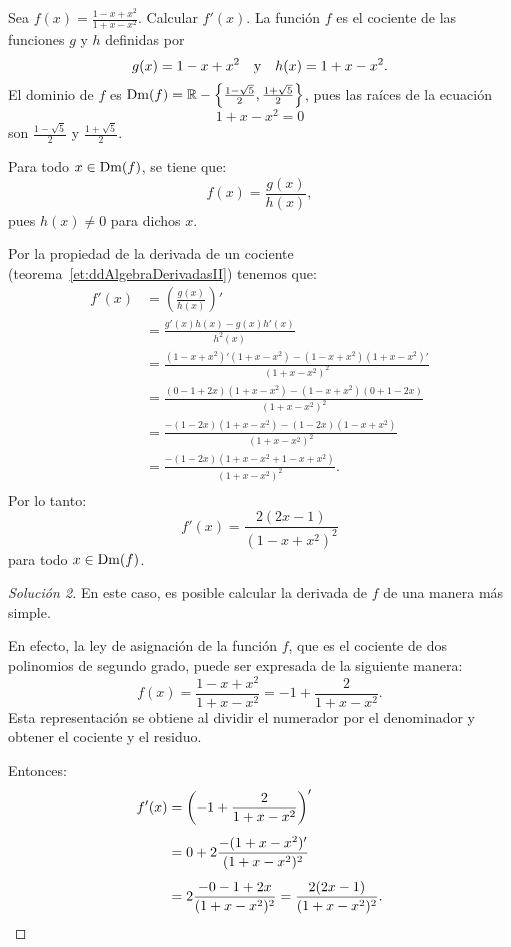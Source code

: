 \begin{exemplo}[Solución]{%
Sea $\displaystyle f(x) = \frac{1 - x + x^2}{1 + x - x^2}$. Calcular $f'(x)$.
}%
La función $f$ es el cociente de las funciones $g$ y $h$ definidas por
\[
g(x) = 1 - x + x^2 \quad\text{y}\quad h(x) = 1 + x - x^2.
\]
El dominio de $f$ es $\operatorname{Dm}(f) = \mathbb{R} - \left\{\frac{1-\sqrt{5}}{2},\frac{1 +
\sqrt{5}}{2}\right\}$, pues las raíces de la ecuación
\[
1 + x - x^2 = 0
\]
son $\frac{1-\sqrt{5}}{2}$ y $\frac{1 + \sqrt{5}}{2}$.

Para todo $x\in\operatorname{Dm}(f)$, se tiene que:
\[
f(x) = \frac{g(x)}{h(x)},
\]
pues $h(x) \neq 0$ para dichos $x$.

Por la propiedad de la derivada de un cociente (teorema~\ref{et:ddAlgebraDerivadasII}) tenemos que:
\begin{align*}
f'(x) &= \left(\frac{g(x)}{h(x)}\right)' \\[4pt]
   &= \frac{g'(x)h(x) - g(x)h'(x)}{h^2(x)} \\[4pt]
   &= \frac{(1 - x + x^2)'(1 + x - x^2) - (1 - x + x^2)(1 + x - x^2)'}{(1 + x - x^2)^2} \\[4pt]
   &= \frac{(0 - 1 + 2x)(1 + x - x^2) - (1 - x + x^2)(0 + 1 - 2x)}{(1 + x - x^2)^2}\\[4pt]
   &= \frac{-(1 - 2x)(1 + x - x^2) - (1 - 2x)(1 - x + x^2)}{(1 + x - x^2)^2} \\[4pt]
   &= \frac{-(1 - 2x)(1 + x - x^2 + 1 - x + x^2)}{(1 + x - x^2)^2}.\\[4pt]
\end{align*}
Por lo tanto:
\[
f'(x) = \frac{2(2x - 1)}{(1 - x + x^2)^2}
\]
para todo $x\in\operatorname{Dm}(f)$.

\begingroup
\renewcommand{\qedsymbol}{}
\begin{proof}[Solución 2]
En este caso, es posible calcular la derivada de $f$ de una manera más simple.

En efecto, la ley de asignación de la función $f$, que es el cociente de dos polinomios de segundo
grado, puede ser expresada de la siguiente manera:
\[
f(x) = \frac{1 - x + x^2}{1 + x - x^2} = -1 + \frac{2}{1 + x - x^2}.
\]
Esta representación se obtiene al dividir el numerador por el denominador y obtener el cociente y
el residuo.

Entonces:
\begin{align*}
f'(x) &= \left(-1 + \frac{2}{1 + x - x^2}\right)' \\[4pt]
   &= 0 + 2\frac{-(1 + x - x^2)'}{(1 +x - x^2)^2} \\[4pt]
   &= 2\frac{-0 - 1 + 2x}{(1 +x - x^2)^2} = \frac{2(2x - 1)}{(1 +x - x^2)^2}.\qedhere
\end{align*}
\end{proof}
\endgroup
\end{exemplo}

